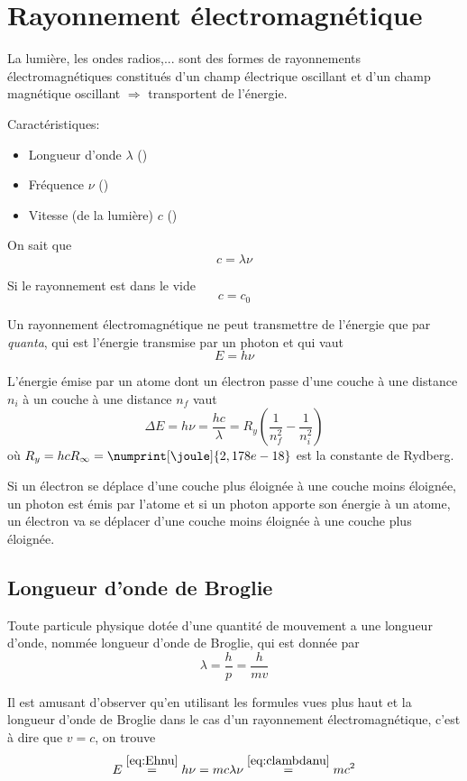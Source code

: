 \section{Rayonnement électromagnétique}

La lumière, les ondes radios,... sont des formes de rayonnements électromagnétiques constitués d'un champ électrique oscillant et d'un champ magnétique oscillant $\Rightarrow$ transportent de l'énergie.

Caractéristiques:
\begin{itemize}
	\item Longueur d'onde $\lambda$ (\meter)
	\item Fréquence $\nu$ (\hertz)
	\item Vitesse (de la lumière) $c$ (\meter\per\second)
\end{itemize}

On sait que
\begin{equation}
	\label{eq:clambdanu}
	c = \lambda \nu
\end{equation}

Si le rayonnement est dans le vide
\[ c = c_0 \]

Un rayonnement électromagnétique ne peut transmettre de l'énergie que par {\it quanta}, qui est l'énergie transmise par un photon et qui vaut
\begin{equation}
	\label{eq:Ehnu}
	E = h\nu
\end{equation}

L'énergie émise par un atome dont un électron passe d'une couche à une distance $n_i$ à un couche à une distance $n_f$ vaut
\[ \Delta E = h\nu = \frac{hc}{\lambda} = R_y \left( \frac{1}{n_f^2} - \frac{1}{n_i^2} \right) \]
où $R_y = hc R_\infty = \numprint[\joule]{2,178e-18}$ est la constante de Rydberg.

Si un électron se déplace d'une couche plus éloignée à une couche moins éloignée,
un photon est émis par l'atome et si un photon apporte son énergie à un atome,
un électron va se déplacer d'une couche moins éloignée à une couche plus éloignée.

\subsection{Longueur d'onde de Broglie}
Toute particule physique dotée d'une quantité de mouvement a une longueur
d'onde, nommée longueur d'onde de Broglie, qui est donnée par
\[ \lambda = \frac{h}{p} = \frac{h}{mv} \]

Il est amusant d'observer qu'en utilisant les formules vues plus haut
et la longueur d'onde de Broglie dans le cas d'un rayonnement électromagnétique,
c'est à dire que $v = c$, on trouve
\[ E \stackrel{\eqref{eq:Ehnu}}{=} h\nu = mc\lambda\nu \stackrel{\eqref{eq:clambdanu}}{=} mc^2 \]

